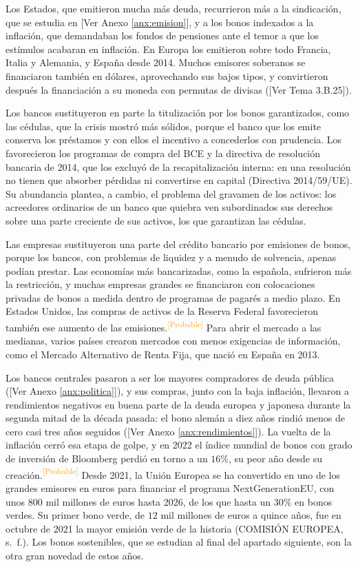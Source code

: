 \documentclass[10pt,a4paper]{article}
\newcommand{\authorfont}[1]{{\fontfamily{EBGaramond-TLF}\selectfont #1}}
\begin{document}
Los Estados, que emitieron mucha más deuda, recurrieron más a la sindicación, que se estudia en [\authorfont{Ver Anexo \ref{anx:emision}}], y a los bonos indexados a la inflación, que demandaban los fondos de pensiones ante el temor a que los estímulos acabaran en inflación. En Europa los emitieron sobre todo Francia, Italia y Alemania, y España desde 2014. Muchos emisores soberanos se financiaron también en dólares, aprovechando sus bajos tipos, y convirtieron después la financiación a su moneda con permutas de divisas ([\authorfont{Ver Tema 3.B.25}]).

Los bancos sustituyeron en parte la titulización por los bonos garantizados, como las cédulas, que la crisis mostró más sólidos, porque el banco que los emite conserva los préstamos y con ellos el incentivo a concederlos con prudencia. Los favorecieron los programas de compra del BCE y la directiva de resolución bancaria de 2014, que los excluyó de la recapitalización interna: en una resolución no tienen que absorber pérdidas ni convertirse en capital (Directiva 2014/59/UE). Su abundancia plantea, a cambio, el problema del gravamen de los activos: los acreedores ordinarios de un banco que quiebra ven subordinados sus derechos sobre una parte creciente de sus activos, los que garantizan las cédulas.

Las empresas sustituyeron una parte del crédito bancario por emisiones de bonos, porque los bancos, con problemas de liquidez y a menudo de solvencia, apenas podían prestar. Las economías más bancarizadas, como la española, sufrieron más la restricción, y muchas empresas grandes se financiaron con colocaciones privadas de bonos a medida dentro de programas de pagarés a medio plazo. En Estados Unidos, las compras de activos de la Reserva Federal favorecieron también ese aumento de las emisiones.\textcolor{orange}{\textsuperscript{[Probable]}} Para abrir el mercado a las medianas, varios países crearon mercados con menos exigencias de información, como el Mercado Alternativo de Renta Fija, que nació en España en 2013.

Los bancos centrales pasaron a ser los mayores compradores de deuda pública ([\authorfont{Ver Anexo \ref{anx:politica}}]), y sus compras, junto con la baja inflación, llevaron a rendimientos negativos en buena parte de la deuda europea y japonesa durante la segunda mitad de la década pasada: el bono alemán a diez años rindió menos de cero casi tres años seguidos ([\authorfont{Ver Anexo \ref{anx:rendimientos}}]). La vuelta de la inflación cerró esa etapa de golpe, y en 2022 el índice mundial de bonos con grado de inversión de Bloomberg perdió en torno a un $16\%$, su peor año desde su creación.\textcolor{orange}{\textsuperscript{[Probable]}} Desde 2021, la Unión Europea se ha convertido en uno de los grandes emisores en euros para financiar el programa NextGenerationEU, con unos $800$ mil millones de euros hasta 2026, de los que hasta un $30\%$ en bonos verdes. Su primer bono verde, de $12$ mil millones de euros a quince años, fue en octubre de 2021 la mayor emisión verde de la historia (COMISIÓN EUROPEA, s.~f.). Los bonos sostenibles, que se estudian al final del apartado siguiente, son la otra gran novedad de estos años.
\end{document}
